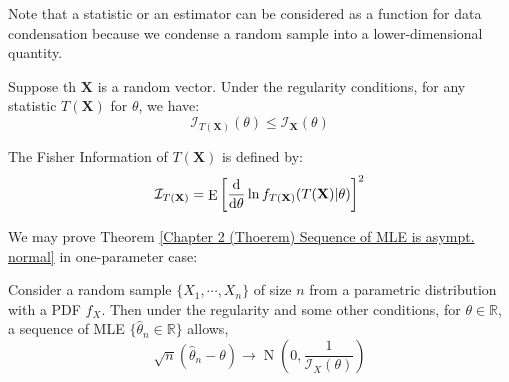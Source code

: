 \documentclass{huhtakm-template-book-v2}
\DeclareMathOperator{\E}{E}
\DeclareMathOperator{\N}{N}
\begin{document}
\newpage
Note that a statistic or an estimator can be considered as a function for data condensation because we condense a random sample into a lower-dimensional quantity.
\begin{lem}
	Suppose th $\mathbf{X}$ is a random vector. Under the regularity conditions, for any statistic $T(\mathbf{X})$ for $\theta$, we have:
	\begin{equation*}
		\mathcal{I}_{T(\mathbf{X})}(\theta)\leq\mathcal{I}_{\mathbf{X}}(\theta)
	\end{equation*}
\end{lem}
\begin{rem}
	The Fisher Information of $T(\mathbf{X})$ is defined by:
	\begin{equation*}
		\mathcal{I}_{T(\mathbf{X})}=\E\left[\odv*{}{\theta}\ln{f_{T(\mathbf{X})}(T(\mathbf{X})|\theta)}\right]^{2}
	\end{equation*}
\end{rem}
We may prove Theorem \ref{Chapter 2 (Thoerem) Sequence of MLE is asympt. normal} in one-parameter case:
\begin{thm}
	Consider a random sample $\{X_{1},\cdots,X_{n}\}$ of size $n$ from a parametric distribution with a PDF $f_{X}$. Then under the regularity and some other conditions, for $\theta\in\mathbb{R}$, a sequence of MLE $\{\hat{\theta}_{n}\in\mathbb{R}\}$ allows,
	\begin{equation*}
		\sqrt{n}(\hat{\theta}_{n}-\theta)\to\N(0,\frac{1}{\mathcal{I}_{X}(\theta)})
	\end{equation*}
\end{thm}
\end{document}
